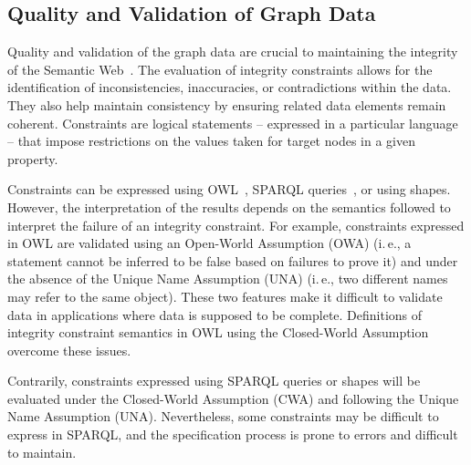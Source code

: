 \documentclass[a4paper,USenglish]{tgdk-v2021}
\begin{document}
\subsection{Quality and Validation of Graph Data}
\label{sec:quality-and-validation}

Quality and validation of the graph data are crucial to maintaining the integrity of the Semantic Web~\cite{DBLP:journals/corr/abs-2308-14217,DBLP:journals/semweb/Debattista0AC18,Zaveri2015surveyQuality}. The evaluation of integrity constraints allows for the identification of inconsistencies, inaccuracies, or contradictions within the data. They also help maintain consistency by ensuring related data elements remain coherent. Constraints are logical statements -- expressed in a particular language -- that impose restrictions on the values taken for target nodes in a given property.

Constraints can be expressed using OWL~\cite{DBLP:conf/aaai/TaoSBM10}, SPARQL queries~\cite{DBLP:conf/edbt/LausenMS08}, or using shapes. However, the interpretation of the results depends on the semantics followed to interpret the failure of an integrity constraint. For example, constraints expressed in OWL are validated using an Open-World Assumption (OWA) (i.\,e., a statement cannot be inferred to be false based on failures to prove it) and under the absence of the Unique Name Assumption (UNA) (i.\,e., two different names may refer to the same object). These two features make it difficult to validate data in applications where data is supposed to be complete. Definitions of integrity constraint semantics in OWL using the Closed-World Assumption~\cite{Motik2007,Motik2009,DBLP:conf/aaai/TaoSBM10} overcome these issues.

Contrarily, constraints expressed using SPARQL queries or shapes will be evaluated under the Closed-World Assumption (CWA) and following the Unique Name Assumption (UNA). Nevertheless, some constraints may be difficult to express in SPARQL, and the specification process is prone to errors and difficult to maintain.
 
\end{document}
